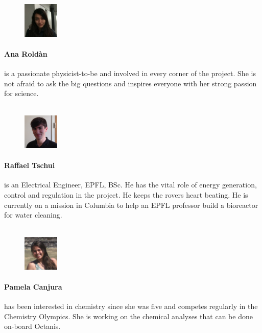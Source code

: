\documentclass[a4paper,12pt]{article}
\begin{document}
\begin{figure}
    \centering
    \vspace{-13pt}
    \includegraphics[width=0.15\textwidth]{ana}
\end{figure}
\paragraph{Ana Roldàn} is a passionate physicist-to-be and involved in every corner of the project. She is not afraid to ask the big questions and inspires everyone with her strong passion for science.
\\ \\

\begin{figure}
     \centering
     \vspace{-13pt}
    \includegraphics[width=0.15\textwidth]{raf}
\end{figure} 
\paragraph{Raffael Tschui} is an Electrical Engineer, EPFL, BSc. He has the vital role of energy generation, control and regulation in the project. He keeps the rovers heart beating. He is currently on a mission in Columbia to help an EPFL professor build a bioreactor for water cleaning.
\\ \\

\begin{figure}
    \centering
    \vspace{-13pt}
    \includegraphics[width=0.15\textwidth]{pam}
\end{figure} 
\paragraph{Pamela Canjura} has been interested in chemistry since she was five and competes regularly in the Chemistry Olympics. She is working on the chemical analyses that can be done on-board Octanis.
\\ \\
\end{document}
